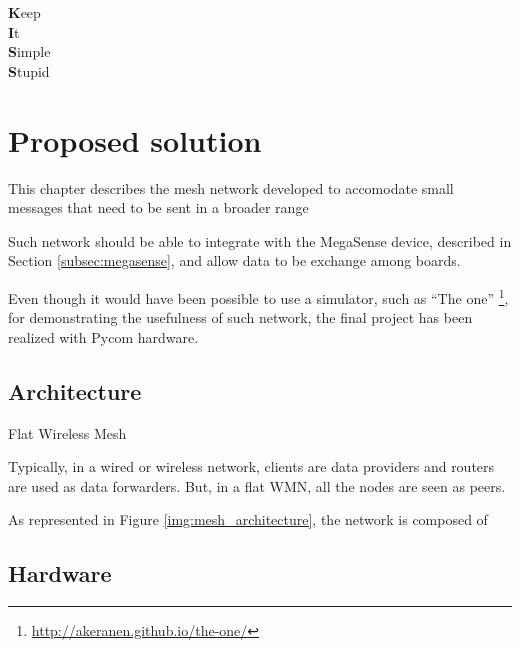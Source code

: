 
\begin{savequote}[40mm]
	\textbf{K}eep\\
	\textbf{I}t\\
	\textbf{S}imple\\
	\textbf{S}tupid
\end{savequote}

\chapter{Proposed solution}\label{chapter:proposed_solution}

	This chapter describes the mesh network developed to accomodate small messages that need to be sent in a broader range
	
	Such network should be able to integrate with the MegaSense device, described in Section \ref{subsec:megasense}, and allow data to be exchange among boards.
	
	Even though it would have been possible to use a simulator, such as ``The one'' \footnote{ \url{http://akeranen.github.io/the-one/}}, for demonstrating the usefulness of such network, the final project has been realized with Pycom hardware.
	
	\section{Architecture}
	
		Flat Wireless Mesh
		
		Typically, in a wired or wireless network, clients are data providers and routers
		are used as data forwarders. But, in a flat WMN, all the nodes are seen as peers. \cite{92000412}
	
		
		As represented in Figure \ref{img:mesh_architecture}, the network is composed of 
	
	\section{Hardware}
	
	
